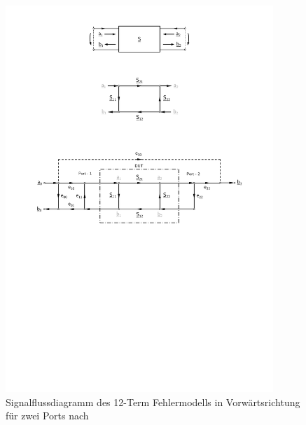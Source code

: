 \begin{figure}[ht]
    \centering
    \includegraphics[page = 1, trim = 2cm 12cm 2cm 10.3cm, clip, width = 0.9\textwidth]{Abbildungen/Kapitel4/Zweitor.pdf}
    \caption{Signalflussdiagramm des 12-Term Fehlermodells in Vorwärtsrichtung für zwei Ports nach~\cite{VNA_Error_Models_and_Calibration_Methods}}
    \label{fig:4_Fehlermodell}
\end{figure}

